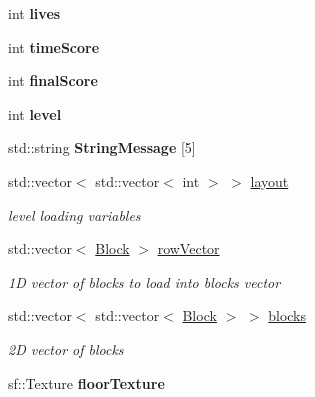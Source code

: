 \begin{DoxyCompactItemize}
\item 
\hypertarget{class_game_play_a134f4b536cb27725ed3bfffa0da7f4ef}{int {\bfseries lives}}\label{class_game_play_a134f4b536cb27725ed3bfffa0da7f4ef}

\item 
\hypertarget{class_game_play_a32aa78dc4bd232cb1119c66399dcb125}{int {\bfseries time\-Score}}\label{class_game_play_a32aa78dc4bd232cb1119c66399dcb125}

\item 
\hypertarget{class_game_play_a9e2d1f5136cf7eb12d8d7c56d54d3c0b}{int {\bfseries final\-Score}}\label{class_game_play_a9e2d1f5136cf7eb12d8d7c56d54d3c0b}

\item 
\hypertarget{class_game_play_ad3e56c63e9689496eb999bf260d85409}{int {\bfseries level}}\label{class_game_play_ad3e56c63e9689496eb999bf260d85409}

\item 
\hypertarget{class_game_play_a8f3424d1523e4a2be8593883a3fd198f}{std\-::string {\bfseries String\-Message} \mbox{[}5\mbox{]}}\label{class_game_play_a8f3424d1523e4a2be8593883a3fd198f}

\item 
std\-::vector$<$ std\-::vector$<$ int $>$ $>$ \hyperlink{class_game_play_aa8ae61ae157cacf1be80773aa9fde3b0}{layout}
\begin{DoxyCompactList}\small\item\em level loading variables \end{DoxyCompactList}\item 
\hypertarget{class_game_play_a87c503c3b96f4158718e4765d37464ce}{std\-::vector$<$ \hyperlink{class_block}{Block} $>$ \hyperlink{class_game_play_a87c503c3b96f4158718e4765d37464ce}{row\-Vector}}\label{class_game_play_a87c503c3b96f4158718e4765d37464ce}

\begin{DoxyCompactList}\small\item\em 1\-D vector of blocks to load into blocks vector \end{DoxyCompactList}\item 
\hypertarget{class_game_play_a28a01697eaf1aff08b9d7ac0106def07}{std\-::vector$<$ std\-::vector$<$ \hyperlink{class_block}{Block} $>$ $>$ \hyperlink{class_game_play_a28a01697eaf1aff08b9d7ac0106def07}{blocks}}\label{class_game_play_a28a01697eaf1aff08b9d7ac0106def07}

\begin{DoxyCompactList}\small\item\em 2\-D vector of blocks \end{DoxyCompactList}\item 
\hypertarget{class_game_play_a97ddf6ce01d8f315c968136f97fb7ec9}{sf\-::\-Texture {\bfseries floor\-Texture}}\label{class_game_play_a97ddf6ce01d8f315c968136f97fb7ec9}


\end{DoxyCompactItemize}
